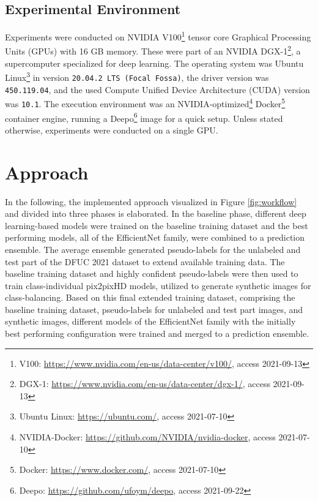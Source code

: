 \documentclass[runningheads]{llncs}
\begin{document}
\subsection{Experimental Environment} %

Experiments were conducted on NVIDIA\textsuperscript{\textregistered} V100\footnote{V100: \url{https://www.nvidia.com/en-us/data-center/v100/}, access 2021-09-13} tensor core Graphical Processing Units (GPUs) with 16 GB memory. These were part of an NVIDIA\textsuperscript{\textregistered} DGX-1\footnote{DGX-1: \url{https://www.nvidia.com/en-us/data-center/dgx-1/}, access 2021-09-13}, a supercomputer specialized for deep learning. The operating system was Ubuntu Linux\footnote{Ubuntu Linux: \url{https://ubuntu.com/}, access 2021-07-10} in version \texttt{20.04.2 LTS (Focal Fossa)}, the driver version was \texttt{450.119.04}, and the used Compute Unified Device Architecture (CUDA) version was \texttt{10.1}. The execution environment was an NVIDIA\textsuperscript{\textregistered}-optimized\footnote{NVIDIA\textsuperscript{\textregistered}-Docker: \url{https://github.com/NVIDIA/nvidia-docker}, access 2021-07-10} Docker\footnote{Docker: \url{https://www.docker.com/}, access 2021-07-10} \cite{merkel2014docker} container engine, running a Deepo\footnote{Deepo: \url{https://github.com/ufoym/deepo}, access 2021-09-22} image for a quick setup. Unless stated otherwise, experiments were conducted on a single GPU.




\section{Approach}
\label{sec:approach}

In the following, the implemented approach visualized in Figure \ref{fig:workflow} and divided into three phases is elaborated. In the baseline phase, different deep learning-based models were trained on the baseline training dataset and the best performing models, all of the EfficientNet family, were combined to a prediction ensemble. The average ensemble generated pseudo-labels for the unlabeled and test part of the DFUC 2021 dataset to extend available training data. The baseline training dataset and highly confident pseudo-labels were then used to train class-individual pix2pixHD models, utilized to generate synthetic images for class-balancing. Based on this final extended training dataset, comprising the baseline training dataset, pseudo-labels for unlabeled and test part images, and synthetic images, different models of the EfficientNet family with the initially best performing configuration were trained and merged to a prediction ensemble.
\end{document}
